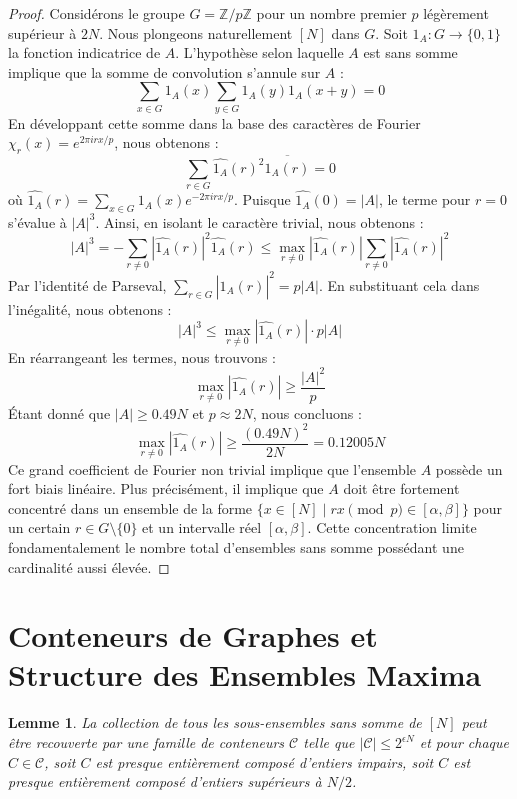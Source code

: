 \documentclass[12pt, a4paper]{article}
\newtheorem{lemma}[theorem]{Lemme}
\begin{document}
\begin{proof}
Consid\'erons le groupe $G = \mathbb{Z} / p\mathbb{Z}$ pour un nombre premier $p$ l\'eg\`erement sup\'erieur \`a $2N$. Nous plongeons naturellement $[N]$ dans $G$.
Soit $1_A : G \to \{0,1\}$ la fonction indicatrice de $A$. L'hypoth\`ese selon laquelle $A$ est sans somme implique que la somme de convolution s'annule sur $A$ :
\[ \sum_{x \in G} 1_A(x) \sum_{y \in G} 1_A(y) 1_A(x+y) = 0 \]
En d\'eveloppant cette somme dans la base des caract\`eres de Fourier $\chi_r(x) = e^{2\pi i r x / p}$, nous obtenons :
\[ \sum_{r \in G} \widehat{1_A}(r)^2 \overline{\widehat{1_A}(r)} = 0 \]
o\`u $\widehat{1_A}(r) = \sum_{x \in G} 1_A(x) e^{-2\pi i r x / p}$.
Puisque $\widehat{1_A}(0) = |A|$, le terme pour $r=0$ s'\'evalue \`a $|A|^3$.
Ainsi, en isolant le caract\`ere trivial, nous obtenons :
\[ |A|^3 = - \sum_{r \neq 0} |\widehat{1_A}(r)|^2 \widehat{1_A}(r) \le \max_{r \neq 0} |\widehat{1_A}(r)| \sum_{r \neq 0} |\widehat{1_A}(r)|^2 \]
Par l'identit\'e de Parseval, $\sum_{r \in G} |\widehat{1_A}(r)|^2 = p |A|$.
En substituant cela dans l'in\'egalit\'e, nous obtenons :
\[ |A|^3 \le \max_{r \neq 0} |\widehat{1_A}(r)| \cdot p |A| \]
En r\'earrangeant les termes, nous trouvons :
\[ \max_{r \neq 0} |\widehat{1_A}(r)| \ge \frac{|A|^2}{p} \]
\'Etant donn\'e que $|A| \ge 0.49N$ et $p \approx 2N$, nous concluons :
\[ \max_{r \neq 0} |\widehat{1_A}(r)| \ge \frac{(0.49N)^2}{2N} = 0.12005N \]
Ce grand coefficient de Fourier non trivial implique que l'ensemble $A$ poss\`ede un fort biais lin\'eaire. Plus pr\'ecis\'ement, il implique que $A$ doit \^etre fortement concentr\'e dans un ensemble de la forme $\{x \in [N] \mid r x \pmod p \in [\alpha, \beta] \}$ pour un certain $r \in G \setminus \{0\}$ et un intervalle r\'eel $[\alpha, \beta]$. Cette concentration limite fondamentalement le nombre total d'ensembles sans somme poss\'edant une cardinalit\'e aussi \'elev\'ee.
\end{proof}

\section{Conteneurs de Graphes et Structure des Ensembles Maxima}

\begin{lemma}
La collection de tous les sous-ensembles sans somme de $[N]$ peut \^etre recouverte par une famille de conteneurs $\mathcal{C}$ telle que $|\mathcal{C}| \le 2^{\epsilon N}$ et pour chaque $C \in \mathcal{C}$, soit $C$ est presque enti\`erement compos\'e d'entiers impairs, soit $C$ est presque enti\`erement compos\'e d'entiers sup\'erieurs \`a $N/2$.
\end{lemma}
\end{document}

